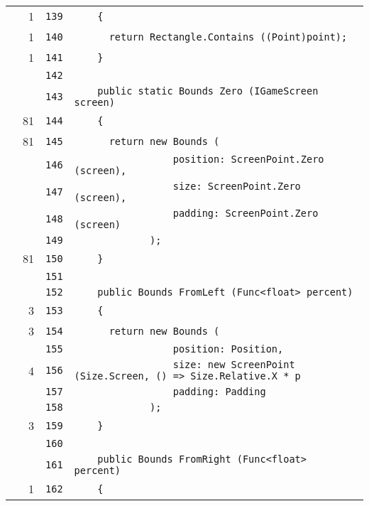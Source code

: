 \documentclass[a4paper,10pt]{article}
\begin{document}
\begin{longtable}[l]{lrrl}
\cellcolor{green} & 1 & \verb~139~ & \verb~    {~\\
\cellcolor{green} & 1 & \verb~140~ & \verb~      return Rectangle.Contains ((Point)point);~\\
\cellcolor{green} & 1 & \verb~141~ & \verb~    }~\\
\cellcolor{gray} &  & \verb~142~ & \verb~~\\
\cellcolor{gray} &  & \verb~143~ & \verb~    public static Bounds Zero (IGameScreen screen)~\\
\cellcolor{green} & 81 & \verb~144~ & \verb~    {~\\
\cellcolor{green} & 81 & \verb~145~ & \verb~      return new Bounds (~\\
\cellcolor{gray} &  & \verb~146~ & \verb~                 position: ScreenPoint.Zero (screen),~\\
\cellcolor{gray} &  & \verb~147~ & \verb~                 size: ScreenPoint.Zero (screen),~\\
\cellcolor{gray} &  & \verb~148~ & \verb~                 padding: ScreenPoint.Zero (screen)~\\
\cellcolor{gray} &  & \verb~149~ & \verb~             );~\\
\cellcolor{green} & 81 & \verb~150~ & \verb~    }~\\
\cellcolor{gray} &  & \verb~151~ & \verb~~\\
\cellcolor{gray} &  & \verb~152~ & \verb~    public Bounds FromLeft (Func<float> percent)~\\
\cellcolor{green} & 3 & \verb~153~ & \verb~    {~\\
\cellcolor{green} & 3 & \verb~154~ & \verb~      return new Bounds (~\\
\cellcolor{gray} &  & \verb~155~ & \verb~                 position: Position,~\\
\cellcolor{green} & 4 & \verb~156~ & \verb~                 size: new ScreenPoint (Size.Screen, () => Size.Relative.X * p~\\
\cellcolor{gray} &  & \verb~157~ & \verb~                 padding: Padding~\\
\cellcolor{gray} &  & \verb~158~ & \verb~             );~\\
\cellcolor{green} & 3 & \verb~159~ & \verb~    }~\\
\cellcolor{gray} &  & \verb~160~ & \verb~~\\
\cellcolor{gray} &  & \verb~161~ & \verb~    public Bounds FromRight (Func<float> percent)~\\
\cellcolor{green} & 1 & \verb~162~ & \verb~    {~\\

\end{longtable}
\end{document}
